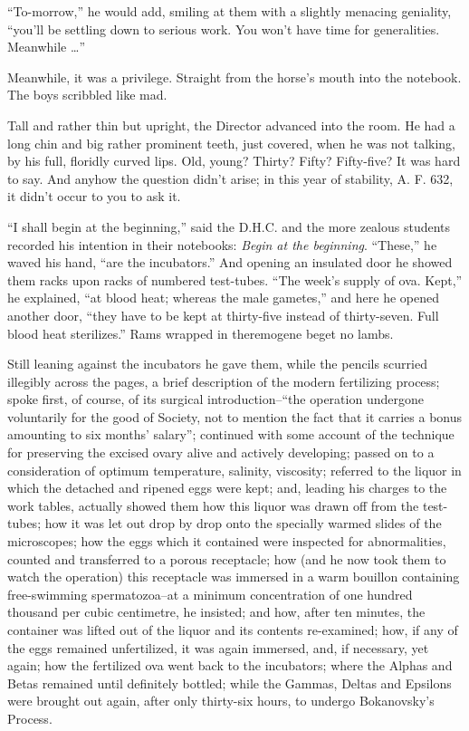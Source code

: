 \documentclass[12pt]{report}
\begin{document}
``To-morrow,'' he would add, smiling at them with a slightly menacing
geniality, ``you'll be settling down to serious work. You won't have
time for generalities. Meanwhile \ldots{}''

Meanwhile, it was a privilege. Straight from the horse's mouth into the
notebook. The boys scribbled like mad.

Tall and rather thin but upright, the Director advanced into the room.
He had a long chin and big rather prominent teeth, just covered, when he
was not talking, by his full, floridly curved lips. Old, young? Thirty?
Fifty? Fifty-five? It was hard to say. And anyhow the question didn't
arise; in this year of stability, A. F. 632, it didn't occur to you to
ask it.

``I shall begin at the beginning,'' said the D.H.C. and the more zealous
students recorded his intention in their notebooks: \emph{Begin at the
beginning}. ``These,'' he waved his hand, ``are the incubators.'' And
opening an insulated door he showed them racks upon racks of numbered
test-tubes. ``The week's supply of ova. Kept,'' he explained, ``at blood
heat; whereas the male gametes,'' and here he opened another door,
``they have to be kept at thirty-five instead of thirty-seven. Full
blood heat sterilizes.'' Rams wrapped in theremogene beget no lambs.

Still leaning against the incubators he gave them, while the pencils
scurried illegibly across the pages, a brief description of the modern
fertilizing process; spoke first, of course, of its surgical
introduction--``the operation undergone voluntarily for the good of
Society, not to mention the fact that it carries a bonus amounting to
six months' salary''; continued with some account of the technique for
preserving the excised ovary alive and actively developing; passed on to
a consideration of optimum temperature, salinity, viscosity; referred to
the liquor in which the detached and ripened eggs were kept; and,
leading his charges to the work tables, actually showed them how this
liquor was drawn off from the test-tubes; how it was let out drop by
drop onto the specially warmed slides of the microscopes; how the eggs
which it contained were inspected for abnormalities, counted and
transferred to a porous receptacle; how (and he now took them to watch
the operation) this receptacle was immersed in a warm bouillon
containing free-swimming spermatozoa--at a minimum concentration of one
hundred thousand per cubic centimetre, he insisted; and how, after ten
minutes, the container was lifted out of the liquor and its contents
re-examined; how, if any of the eggs remained unfertilized, it was again
immersed, and, if necessary, yet again; how the fertilized ova went back
to the incubators; where the Alphas and Betas remained until definitely
bottled; while the Gammas, Deltas and Epsilons were brought out again,
after only thirty-six hours, to undergo Bokanovsky's Process.
\end{document}
